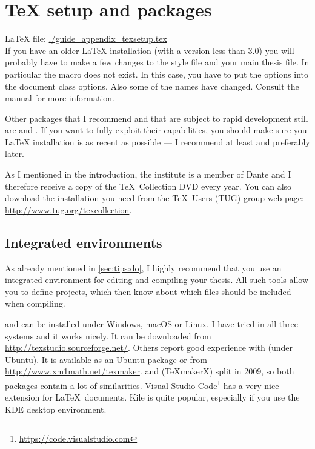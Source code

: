
\chapter{\TeX{} setup and packages}%
\label{sec:app:tex}

\LaTeX{} file: \url{./guide_appendix_texsetup.tex}\\[1ex]
\noindent
If you have an older \LaTeX{} installation (with a \KOMAScript{}
version less than 3.0) you will probably have to make a few changes to
the style file and your main thesis file.
In particular the  macro does not exist. In this case, you
have to put the options into the document class options. Also some of
the names have changed. Consult the \KOMAScript{} manual for more
information.

Other packages that I recommend and that are subject to rapid
development still are  and
. If you want to fully exploit their capabilities,
you should make sure you \LaTeX{} installation is as recent as
possible --- I recommend at least  and preferably later.

As I mentioned in the introduction, the institute is a member of Dante
and I therefore receive a copy of the \TeX\ Collection DVD every year.
You can also download the installation you need from the \TeX\
Users (TUG) group web page: \url{http://www.tug.org/texcollection}.


\section{Integrated environments}%
\label{sec:app:compile}

As already mentioned in \cref{sec:tips:do}, I highly recommend
that you use an integrated environment for editing and compiling your
thesis. All such tools allow you to define projects, which then know
about which files should be included when compiling.

\TeXstudio{} and
\TeXmaker{} can be installed under Windows, macOS or
Linux. I have tried \TeXstudio in all three systems and it works nicely. It
can be downloaded from \url{http://texstudio.sourceforge.net/}. Others
report good experience with \TeXmaker (under Ubuntu).
It is available as an Ubuntu package or from
\url{http://www.xm1math.net/texmaker}.
\TeXmaker and \TeXstudio (\TeX makerX) split in 2009, so both packages
contain a lot of similarities.
Visual Studio Code\footnote{%
\url{https://code.visualstudio.com}}
has a very nice extension for \LaTeX\ documents.
Kile is quite popular, especially if you use the KDE
desktop environment. 

